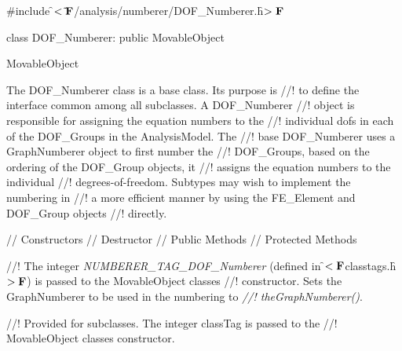 
\indent \#include \f$<\tilde{ }{\bf F}$/analysis/numberer/DOF\_Numberer.h\f$>{\bf F}$

\indent class DOF\_Numberer: public MovableObject

\indent MovableObject
\indent{}

\indent The DOF\_Numberer class is a base class. Its purpose is
//! to define the interface common among all subclasses.  A DOF\_Numberer
//! object is responsible for assigning the equation numbers to the
//! individual dofs in each of the  DOF\_Groups in the AnalysisModel. The
//! base DOF\_Numberer uses a GraphNumberer object to first number the
//! DOF\_Groups, based on the ordering of the DOF\_Group objects, it
//! assigns the equation numbers to the individual
//! degrees-of-freedom. Subtypes may wish to implement the numbering in
//! a more efficient manner by using the FE\_Element and DOF\_Group objects
//! directly.


\indent // Constructors
\indent // Destructor
\indent // Public Methods
\indent // Protected Methods


//! The integer {\em NUMBERER\_TAG\_DOF\_Numberer}
(defined in \f$<{\bf F}$classtags.h\f$>{\bf F}$) is passed to the MovableObject classes
//! constructor. Sets the GraphNumberer to be used in the numbering to {\em
//! theGraphNumberer()}.

//! Provided for subclasses. The integer \p classTag is passed to the
//! MovableObject classes constructor.


